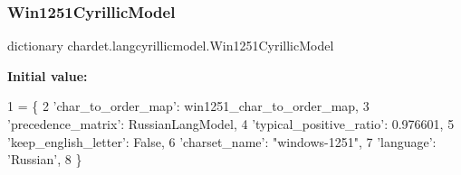 \subsubsection{\texorpdfstring{Win1251\+Cyrillic\+Model}{Win1251CyrillicModel}}
{\footnotesize\ttfamily dictionary chardet.\+langcyrillicmodel.\+Win1251\+Cyrillic\+Model}

{\bfseries Initial value\+:}
\begin{DoxyCode}
1 =  \{
2   \textcolor{stringliteral}{'char\_to\_order\_map'}: win1251\_char\_to\_order\_map,
3   \textcolor{stringliteral}{'precedence\_matrix'}: RussianLangModel,
4   \textcolor{stringliteral}{'typical\_positive\_ratio'}: 0.976601,
5   \textcolor{stringliteral}{'keep\_english\_letter'}: \textcolor{keyword}{False},
6   \textcolor{stringliteral}{'charset\_name'}: \textcolor{stringliteral}{"windows-1251"},
7   \textcolor{stringliteral}{'language'}: \textcolor{stringliteral}{'Russian'},
8 \}
\end{DoxyCode}

